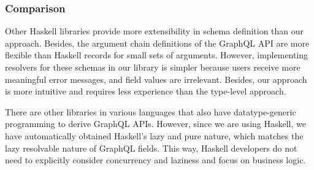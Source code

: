 \begin{frame}\frametitle{Comparison}

Other Haskell libraries provide more extensibility in schema definition than our approach. Besides, the argument chain definitions of the GraphQL API are more flexible than Haskell records for small sets of arguments. However, implementing resolvers for these schemas in our library is simpler because users receive more meaningful error messages, and field values are irrelevant. Besides, our approach is more intuitive and requires less experience than the type-level approach.

There are other libraries in various languages that also have datatype-generic programming to derive GraphQL APIs. However, since we are using Haskell, we have automatically obtained Haskell's lazy and pure nature, which matches the lazy resolvable nature of GraphQL fields. This way, Haskell developers do not need to explicitly consider concurrency and laziness and focus on business logic. 

\end{frame}
